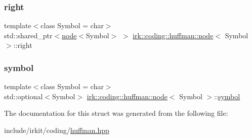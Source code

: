\subsubsection{\texorpdfstring{right}{right}}
{\footnotesize\ttfamily template$<$class Symbol = char$>$ \\
std\+::shared\+\_\+ptr$<$\mbox{\hyperlink{structirk_1_1coding_1_1huffman_1_1node}{node}}$<$Symbol$>$ $>$ \mbox{\hyperlink{structirk_1_1coding_1_1huffman_1_1node}{irk\+::coding\+::huffman\+::node}}$<$ Symbol $>$\+::right}

\mbox{\label{structirk_1_1coding_1_1huffman_1_1node_a5506528b3c23fa2187b767a90ca3bfcc}} 
\subsubsection{\texorpdfstring{symbol}{symbol}}
{\footnotesize\ttfamily template$<$class Symbol = char$>$ \\
std\+::optional$<$Symbol$>$ \mbox{\hyperlink{structirk_1_1coding_1_1huffman_1_1node}{irk\+::coding\+::huffman\+::node}}$<$ Symbol $>$\+::\mbox{\hyperlink{porter2_8hpp_a04438e24473719aaf288c57833717164}{symbol}}}



The documentation for this struct was generated from the following file\+:\begin{DoxyCompactItemize}
\item 
include/irkit/coding/\mbox{\hyperlink{huffman_8hpp}{huffman.\+hpp}}\end{DoxyCompactItemize}
